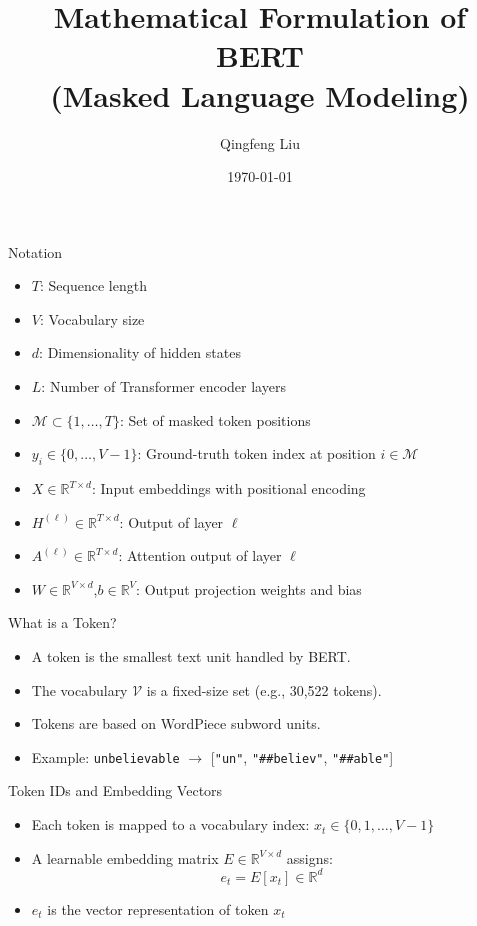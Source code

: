 \documentclass{beamer}
\title{Mathematical Formulation of BERT\\(Masked Language Modeling)}
\author{Qingfeng Liu}
\date{\today }
\begin{document}
	
	\frame{\titlepage}
	
	\begin{frame}{Notation}
		\begin{itemize}
			\item $T$: Sequence length
			\item $V$: Vocabulary size
			\item $d$: Dimensionality of hidden states
			\item $L$: Number of Transformer encoder layers
			\item $\mathcal{M} \subset \{1, \dots, T\}$: Set of masked token positions
			\item $y_i \in \{0, \dots, V{-}1\}$: Ground-truth token index at position $i \in \mathcal{M}$
			\item $X \in \mathbb{R}^{T \times d}$: Input embeddings with positional encoding
			\item $H^{(\ell)} \in \mathbb{R}^{T \times d}$: Output of layer $\ell$
			\item $A^{(\ell)} \in \mathbb{R}^{T \times d}$: Attention output of layer $\ell$
			\item $W \in \mathbb{R}^{V \times d}$,\quad $b \in \mathbb{R}^V$: Output projection weights and bias
		\end{itemize}
	\end{frame}
	
	\begin{frame}{What is a Token?}
		\begin{itemize}
			\item A token is the smallest text unit handled by BERT.
			\item The vocabulary $\mathcal{V}$ is a fixed-size set (e.g., 30,522 tokens).
			\item Tokens are based on WordPiece subword units.
			\item Example: \texttt{unbelievable} $\rightarrow$ [\texttt{"un"}, \texttt{"\#\#believ"}, \texttt{"\#\#able"}]
		\end{itemize}
	\end{frame}
	
	\begin{frame}{Token IDs and Embedding Vectors}
		\begin{itemize}
			\item Each token is mapped to a vocabulary index: $x_t \in \{0, 1, \dots, V{-}1\}$
			\item A learnable embedding matrix $E \in \mathbb{R}^{V \times d}$ assigns:
			\[
			e_t = E[x_t] \in \mathbb{R}^d
			\]
			\item $e_t$ is the vector representation of token $x_t$
		\end{itemize}
	\end{frame}
	
\end{document}
